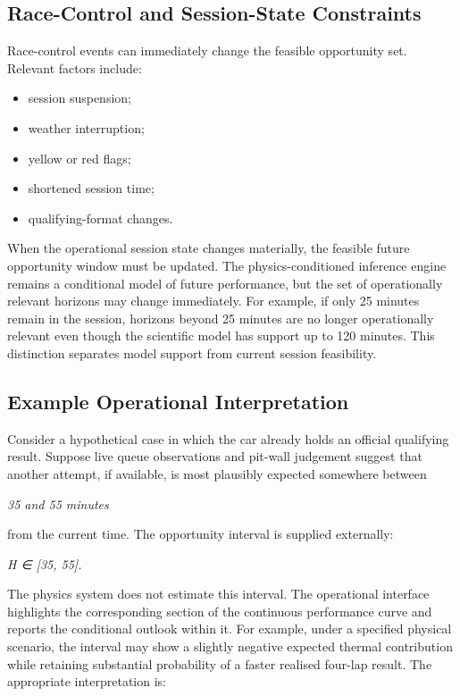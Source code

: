 \subsection{Race-Control and Session-State Constraints}
Race-control events can immediately change the feasible opportunity set. Relevant factors include:

\begin{itemize}
\item session suspension;
\item weather interruption;
\item yellow or red flags;
\item shortened session time;
\item qualifying-format changes.
\end{itemize}

When the operational session state changes materially, the feasible future opportunity window must be updated. The physics-conditioned inference engine remains a conditional model of future performance, but the set of operationally relevant horizons may change immediately. For example, if only 25 minutes remain in the session, horizons beyond 25 minutes are no longer operationally relevant even though the scientific model has support up to 120 minutes. This distinction separates model support from current session feasibility.

\subsection{Example Operational Interpretation}
Consider a hypothetical case in which the car already holds an official qualifying result. Suppose live queue observations and pit-wall judgement suggest that another attempt, if available, is most plausibly expected somewhere between

\begin{center}\textit{35     and    55 minutes}\end{center}

from the current time. The opportunity interval is supplied externally:

\begin{center}\textit{H ∈ [35, 55].}\end{center}

The physics system does not estimate this interval. The operational interface highlights the corresponding section of the continuous performance curve and reports the conditional outlook within it. For example, under a specified physical scenario, the interval may show a slightly negative expected thermal contribution while retaining substantial probability of a faster realised four-lap result. The appropriate interpretation is:

